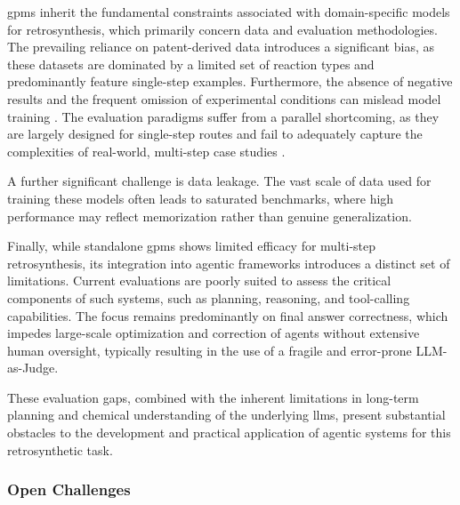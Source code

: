 \glspl{gpm} inherit the fundamental constraints associated with domain-specific models for retrosynthesis, which primarily concern data and evaluation methodologies. The prevailing reliance on patent-derived data introduces a significant bias, as these datasets are dominated by a limited set of reaction types and predominantly feature single-step examples. Furthermore, the absence of negative results and the frequent omission of experimental conditions can mislead model training \autocite{Lee2024noise, Voinarovska2023when, Saebi2023onthe, Maloney2023negative, Tadanki2025dissecting}. The evaluation paradigms suffer from a parallel shortcoming, as they are largely designed for single-step routes and fail to adequately capture the complexities of real-world, multi-step case studies \autocite{TorrenPeraire2024models, maziarz2025re, liu2024evaluating}.

A further significant challenge is data leakage. The vast scale of data used for training these models often leads to saturated benchmarks, where high performance may reflect memorization rather than genuine generalization.

Finally, while standalone \glspl{gpm} shows limited efficacy for multi-step retrosynthesis, its integration into agentic frameworks introduces a distinct set of limitations. Current evaluations are poorly suited to assess the critical components of such systems, such as planning, reasoning, and tool-calling capabilities. The focus remains predominantly on final answer correctness, which impedes large-scale optimization and correction of agents without extensive human oversight, typically resulting in the use of a fragile and error-prone LLM-as-Judge. 

These evaluation gaps, combined with the inherent limitations in long-term planning and chemical understanding of the underlying \glspl{llm}, present substantial obstacles to the development and practical application of agentic systems for this retrosynthetic task.


\subsubsection{Open Challenges}

